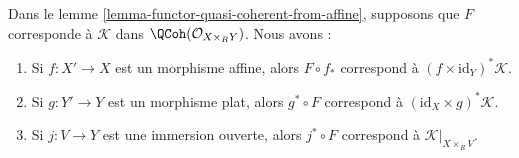 \begin{lemma}
\label{lemma-functor-quasi-coherent-from-affine-compose}
Dans le lemme \ref{lemma-functor-quasi-coherent-from-affine}, supposons que $F$
corresponde à $\mathcal{K}$ dans $\QCoh(\mathcal{O}_{X \times_R Y})$.
Nous avons :
\begin{enumerate}
\item Si $f : X' \to X$ est un morphisme affine, alors $F \circ f_*$
correspond à $(f \times \text{id}_Y)^*\mathcal{K}$.
\item Si $g : Y' \to Y$ est un morphisme plat, alors $g^* \circ F$ correspond à
$(\text{id}_X \times g)^*\mathcal{K}$.
\item Si $j : V \to Y$ est une immersion ouverte, alors $j^* \circ F$
correspond à $\mathcal{K}|_{X \times_R V}$.
\end{enumerate}
\end{lemma}

